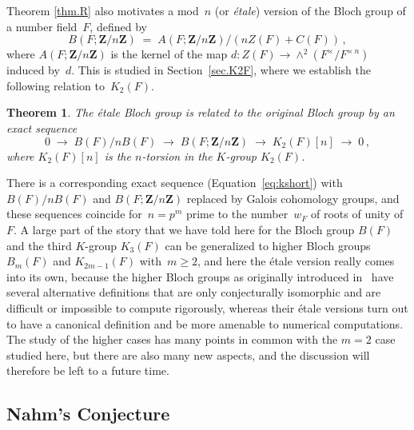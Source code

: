 \documentclass[12pt,reqno]{amsart}
\newtheorem{theorem}{Theorem}[section]
\theoremstyle{definition}
\newcommand{\changed}[1]{{#1}}
\def\be{\begin{equation}}
\def\ee{\end{equation}}
\def\={\;=\;}
\def\Z{\mathbf Z}   %
\def\red{\color{red}}
\def\QU{{\red\,??\,}}
\def\Ker{\mathrm{Ker}}
\def\map{\;\longrightarrow\;}
\def\nn{n}
\begin{document}
Theorem \ref{thm.R} \changed{also}
motivates a mod~$\nn$ (or \emph{\'etale}) version of the 
Bloch group of a number field~$F$, defined by
\be
\label{BFn}
B(F;\Z/\nn\Z) \= A(F;\Z/\nn\Z)/(\nn Z(F)+ C(F))\,,
\ee
where $A(F;\Z/\nn\Z)$ is the kernel of the map 
$d:Z(F)\to\wedge^2(F^\times/F^{\times\,\nn})$ induced by~$d$. This  is studied 
in Section~\ref{sec.K2F}, where we establish the following relation 
to~$K_2(F)$.

\begin{theorem}
\label{thm.K2}
The \'etale Bloch group is related to the original Bloch group by an exact 
sequence
\be
\label{Skype}
0 \map B(F)/\nn B(F) \map B(F;\Z/\nn \Z) \map K_2(F)[\nn] \map 0 \,,
\ee
where $K_2(F)[\nn]$ is the $\nn$-torsion in the $K$-group $K_2(F)$.
\end{theorem}

There is a corresponding exact sequence (Equation~\eqref{eq:kshort})
with~$B(F)/\nn B(F)$ \changed{and $B(F;\Z/\nn \Z)$ replaced by Galois
cohomology groups, and these sequences coincide for~$\nn = p^m$
prime to the number~$w_F$ of roots of unity of~$F$.}
\smallskip
A large part of the story that we have told here for the Bloch group 
$B(F)$ and the third $K$-group $K_3(F)$ can be generalized to higher Bloch 
groups $B_m(F)$ and $K_{2m-1}(F)$ with~$m\ge2$, and here the \'etale version 
really comes into its own, because the higher Bloch groups as originally 
introduced in~\cite{Za:texel} have several alternative definitions that 
are only conjecturally isomorphic and are difficult or impossible to compute 
rigorously, whereas their \'etale versions turn out to have a canonical 
definition and be \changed{more} amenable to \changed{numerical} computations.  The study of the 
higher cases has many \changed{points} in common with the $m=2$ case studied here, 
but there are also many new aspects, and the discussion will therefore be 
\changed{left to a future time}.


\subsection{Nahm's Conjecture}
\label{sub.intro.nahm}
\end{document}
